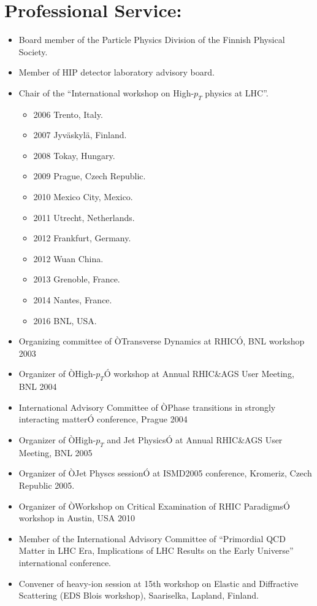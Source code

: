 \documentclass[12pt]{article}
\begin{document}
\section{Professional Service:}
\begin{itemize}
\item Board member of the Particle Physics Division of the Finnish Physical Society.
\item Member of HIP detector laboratory advisory board. 
\item Chair of the ``International workshop on High-$p_{T}$ physics at LHC''.
\begin{itemize}
	\item 2006 Trento, Italy.
	\item 2007 Jyv\"askyl\"a, Finland.
	\item 2008 Tokay, Hungary.
	\item 2009 Prague, Czech Republic.
	\item 2010  Mexico City, Mexico.
	\item 2011 Utrecht, Netherlands.
	\item 2012 Frankfurt, Germany.
	\item 2012 Wuan China.
	\item 2013 Grenoble, France.
	\item 2014 Nantes, France.
	\item 2016 BNL, USA.
\end{itemize}
\item Organizing committee of ÒTransverse Dynamics at RHICÓ, BNL workshop 2003
\item Organizer of ÒHigh-$p_{T}$Ó workshop at Annual RHIC\&AGS User Meeting, BNL 2004
\item International Advisory Committee of ÒPhase transitions in strongly interacting matterÓ conference, Prague 2004
\item Organizer of ÒHigh-$p_{T}$ and Jet PhysicsÓ at Annual RHIC\&AGS User Meeting, BNL 2005
\item Organizer of ÒJet Physcs sessionÓ at ISMD2005 conference, Kromeriz, Czech Republic 2005.
\item Organizer of ÒWorkshop on Critical Examination of RHIC ParadigmsÓ workshop in Austin, USA 2010
\item Member of the International Advisory Committee of ``Primordial QCD Matter in LHC Era, Implications of LHC Results on the Early Universe'' international conference.
\item Convener of heavy-ion session at 15th workshop on Elastic and Diffractive Scattering (EDS Blois workshop), Saariselka, Lapland, Finland.
\end{itemize}
\end{document}
